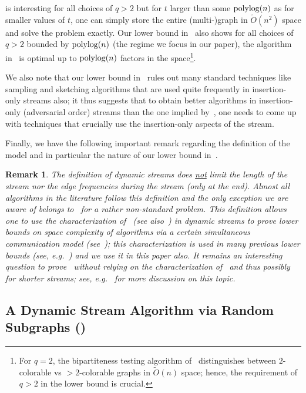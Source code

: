 \documentclass[11pt]{article}
\newtheorem{remark}[lemma]{Remark}
\theoremstyle{definition}
\newcommand{\Ot}{\ensuremath{\widetilde{O}}}
\newcommand{\poly}{\mbox{\rm poly}}
\begin{document}
 is interesting for all choices of $q > 2$ but for $t$ larger than some $\poly\!\log{\!(n)}$ as for smaller values of $t$, one can simply store the entire (multi-)graph in $\Ot(n^2)$ space and solve the problem exactly. 
Our lower bound in~ also shows for all choices of $q > 2$ bounded by $\poly\!\log{\!(n)}$ (the regime we focus in our paper), the algorithm in~ is optimal up to $\poly\!\log{\!(n)}$ factors in the space\footnote{For $q=2$, the bipartiteness testing algorithm of~\cite{AhnGM12} distinguishes between $2$-colorable vs $>2$-colorable graphs in $\Ot(n)$ space; hence, the requirement of $q > 2$ in the lower bound is crucial.}. 

We also note that our lower bound in~ rules out many standard techniques like sampling and sketching algorithms that are used quite frequently in insertion-only streams also; it thus suggests 
that to obtain better algorithms in insertion-only (adversarial order) streams than the one implied by~, one needs to come up with techniques that crucially use the insertion-only aspects of the stream. 

 Finally, we have the following important remark regarding the definition of the model and in particular the nature of our lower bound in~. 
 
 \begin{remark}\label{rem:sim-dynamic}
 	The definition of dynamic streams does \underline{not} limit the length of the stream nor the edge frequencies during the stream (only at the end). Almost all algorithms in the literature follow this definition 
	and the only exception we are aware of belongs to~\cite{KallaugherP20} for a rather non-standard problem. This definition allows one to use the characterization of~\cite{AiHLW16} (see also~\cite{LiNW14}) 
	in dynamic streams to prove lower bounds on space complexity of algorithms via a certain simultaneous communication model (see~); this characterization is used 
	in many previous lower bounds (see, e.g.~\cite{Konrad15,WeinsteinW15,AssadiKLY16,AssadiKL17}) and we use it in this paper also. It remains an interesting 
	question to prove~ without relying on the characterization of~\cite{AiHLW16} and thus possibly for shorter streams; see, e.g.~\cite{DarkK20} for more discussion on this topic. 
 \end{remark} 


\subsection{A Dynamic Stream Algorithm via Random Subgraphs ()}\label{sec:dynamic-algo}
\end{document}

